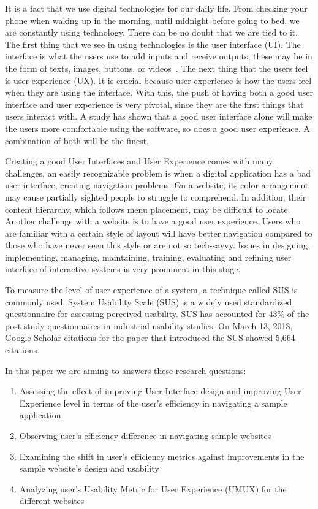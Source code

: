 \documentclass[conference]{IEEEtran}
\begin{document}
It is a fact that we use digital technologies for our daily life. From checking your phone when waking up in the morning, until midnight before going to bed, we are constantly using technology. There can be no doubt that we are tied to it. The first thing that we see in using technologies is the user interface (UI). The interface is what the users use to add inputs and receive outputs, these may be in the form of texts, images, buttons, or videos~\cite{Gramedia}. The next thing that the users feel is user experience (UX). It is crucial because user experience is how the users feel when they are using the interface\cite{Gramedia}. With this, the push of having both a good user interface and user experience is very pivotal, since they are the first things that users interact with. A study has shown that a good user interface alone will make the users more comfortable using the software, so does a good user experience\cite{Watulingas}. A combination of both will be the finest\cite{Watulingas}.

Creating a good User Interfaces and User Experience comes with many challenges, an easily recognizable problem is when a digital application has a bad user interface, creating navigation problems. On a website, its color arrangement may cause partially sighted people to struggle to comprehend. In addition, their content hierarchy, which follows menu placement, may be difficult to locate. Another challenge with a website is to have a good user experience. Users who are familiar with a certain style of layout will have better navigation compared to those who have never seen this style or are not so tech-savvy.  Issues in designing, implementing, managing, maintaining, training, evaluating and refining user interface of interactive systems is very prominent in this stage\cite{Shneiderman1987}.

To measure the level of user experience of a system, a technique called SUS is commonly used. System Usability Scale (SUS) is a widely used standardized questionnaire for assessing perceived usability\cite{JamesRLewis2018}.  SUS has accounted for 43\% of the post-study questionnaires in industrial usability studies\cite{JamesRLewis2018}. On March 13, 2018, Google Scholar citations for the paper that introduced the SUS showed 5,664 citations\cite{JamesRLewis2018}.

In this paper we are aiming to answers these research questions:

\begin{enumerate}
    \item Assessing the effect of improving User Interface design and improving User Experience level in terms of the user's efficiency in navigating a sample application
    \item Observing user's efficiency difference in navigating sample websites
    \item Examining the shift in user's efficiency metrics against improvements in the sample website's design and usability
    \item Analyzing user's Usability Metric for User Experience (UMUX) for the different websites
\end{enumerate}
\end{document}
